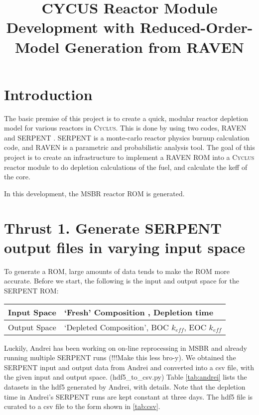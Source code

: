 \documentclass{article}
\newcommand{\Cyclus}{\textsc{Cyclus}\xspace}%
\begin{document}
\title{CYCUS Reactor Module Development with Reduced-Order-Model Generation from RAVEN}

\date{}                     %



\section{Introduction}

The basic premise of this project is to create a quick, modular
reactor depletion model for various reactors in \Cyclus. This is done
by using two codes, RAVEN \cite{alfonsi_raven_2013} and SERPENT \cite{leppanen_serpent-a_2013} . SERPENT is a monte-carlo
reactor physics burnup calculation code, and RAVEN is a parametric
and probabilistic analysis tool. The goal of this project is to 
create an infrastructure to implement a RAVEN \gls{ROM} into a \Cyclus
reactor module to do depletion calculations of the fuel, and calculate
the keff of the core. 

In this development, the \gls{MSBR} \cite{robertson_conceptual_1971}
reactor \gls{ROM} is generated.

\section*{Thrust 1. Generate SERPENT output files in varying input space}
To generate a \gls{ROM}, large amounts of data tends to make the
\gls{ROM} more accurate. Before we start, the following is the input and 
output space for the SERPENT \gls{ROM}:

\begin{center}
\begin{tabular}{ l l }
    \hline
    Input Space & `Fresh' Composition , Depletion time \\
    \hline
    Output Space & `Depleted Composition', BOC $k_{eff}$, EOC $k_{eff}$ \\
    \hline
\end{tabular}
\end{center} 

Luckily, Andrei has been working on on-line reprocessing in \gls{MSBR}
and already running multiple SERPENT runs (!!!Make this less bro-y).
We obtained the SERPENT input and output data from Andrei and converted
into a csv file, with the given input and output space. (hdf5\_to\_csv.py)
Table \ref{tab:andrei} lists the datasets in the hdf5 generated by Andrei,
with details. Note that the depletion time in Andrei's SERPENT runs are
kept constant at three days. The hdf5 file is curated to a csv file to
the form shown in \ref{tab:csv}.
\FloatBarrier
\end{document}
